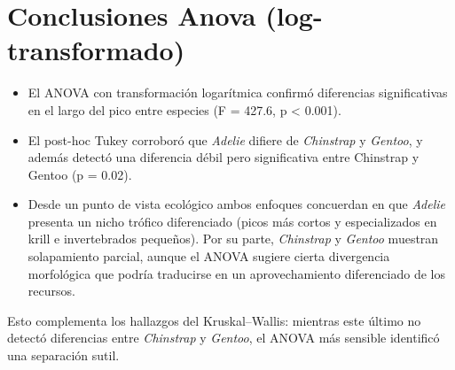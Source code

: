 \documentclass[
  spanish,
  11pt,
  a4paper,
  DIV=11,
  numbers=noendperiod]{scrartcl}
\begin{document}
\section{Conclusiones Anova
(log-transformado)}\label{conclusiones-anova-log-transformado}

\begin{itemize}
\item
  El ANOVA con transformación logarítmica confirmó diferencias
  significativas en el largo del pico entre especies (F = 427.6, p
  \textless{} 0.001).
\item
  El post-hoc Tukey corroboró que \emph{Adelie} difiere de
  \emph{Chinstrap} y \emph{Gentoo}, y además detectó una diferencia
  débil pero significativa entre Chinstrap y Gentoo (p = 0.02).
\item
  Desde un punto de vista ecológico ambos enfoques concuerdan en que
  \emph{Adelie} presenta un nicho trófico diferenciado (picos más cortos
  y especializados en krill e invertebrados pequeños). Por su parte,
  \emph{Chinstrap} y \emph{Gentoo} muestran solapamiento parcial, aunque
  el ANOVA sugiere cierta divergencia morfológica que podría traducirse
  en un aprovechamiento diferenciado de los recursos.
\end{itemize}

Esto complementa los hallazgos del Kruskal--Wallis: mientras este último
no detectó diferencias entre \emph{Chinstrap} y \emph{Gentoo}, el ANOVA
más sensible identificó una separación sutil.
\end{document}
